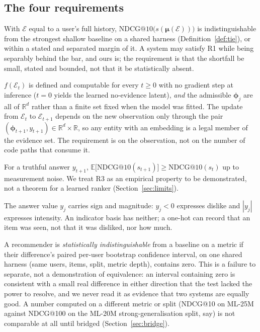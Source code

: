 \documentclass[manuscript,screen]{acmart}
\newcommand{\R}{\mathbb{R}}
\newcommand{\bphi}{\boldsymbol{\phi}}
\newcommand{\bmu}{\boldsymbol{\mu}}
\begin{document}
\subsection{The four requirements}
\begin{description}[leftmargin=2.4em,itemsep=1.5pt]
  \item[R1.] With $\mathcal E$ equal to a user's full history, $\mathrm{NDCG}@10\bigl(s(\bmu(\mathcal E))\bigr)$ is indistinguishable from the strongest shallow baseline on a shared harness (Definition~\ref{def:tie}), or within a stated and separated margin of it. A system may satisfy R1 while being separably behind the bar, and ours is; the requirement is that the shortfall be small, stated and bounded, not that it be statistically absent.
  \item[R2.] $f(\mathcal E_t)$ is defined and computable for every $t\ge 0$ with no gradient step at inference ($t{=}0$ yields the learned no-evidence latent), \emph{and} the admissible $\bphi_j$ are all of $\R^{d}$ rather than a finite set fixed when the model was fitted. The update from $\mathcal E_t$ to $\mathcal E_{t+1}$ depends on the new observation only through the pair $(\bphi_{t+1},y_{t+1})\in\R^{d}\times\R$, so any entity with an embedding is a legal member of the evidence set. The requirement is on the observation, not on the number of code paths that consume it.
  \item[R3.] For a truthful answer $y_{t+1}$, $\mathbb E\bigl[\mathrm{NDCG}@10(s_{t+1})\bigr]\ge \mathrm{NDCG}@10(s_t)$ up to measurement noise. We treat R3 as an empirical property to be demonstrated, not a theorem for a learned ranker (Section~\ref{sec:limits}).
  \item[R4.] The answer value $y_j$ carries sign and magnitude: $y_j<0$ expresses dislike and $|y_j|$ expresses intensity. An indicator basis has neither; a one-hot can record that an item was seen, not that it was disliked, nor how much.
\end{description}

\begin{definition}\label{def:tie}
A recommender is \emph{statistically indistinguishable} from a baseline on a metric if their difference's paired per-user bootstrap confidence interval, on one shared harness (same users, items, split, metric depth), contains zero. This is a failure to separate, not a demonstration of equivalence: an interval containing zero is consistent with a small real difference in either direction that the test lacked the power to resolve, and we never read it as evidence that two systems are equally good. A number computed on a different metric or split (NDCG@10 on ML-25M against NDCG@100 on the ML-20M strong-generalisation split, say) is not comparable at all until bridged (Section~\ref{sec:bridge}).
\end{definition}
\end{document}
